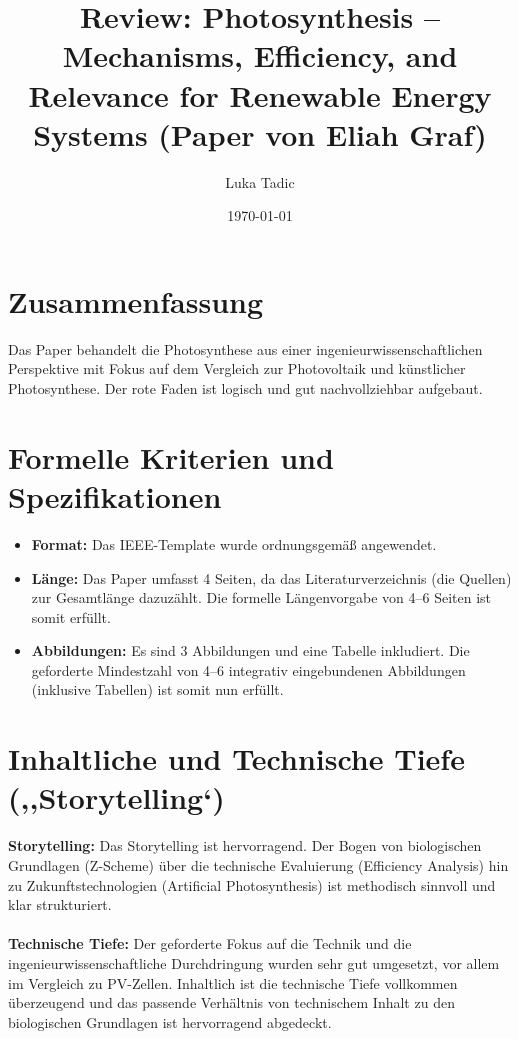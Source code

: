 ﻿\documentclass[11pt, a4paper, ngerman]{article}
\title{Review: Photosynthesis -- Mechanisms, Efficiency, and Relevance for Renewable Energy Systems (Paper von Eliah Graf)}
\author{Luka Tadic}
\date{\today}
\begin{document}
\maketitle

\section{Zusammenfassung}
Das Paper behandelt die Photosynthese aus einer ingenieurwissenschaftlichen Perspektive mit Fokus auf dem Vergleich zur Photovoltaik und künstlicher Photosynthese. Der rote Faden ist logisch und gut nachvollziehbar aufgebaut.

\section{Formelle Kriterien und Spezifikationen}
\begin{itemize}
    \item \textbf{Format:} Das IEEE-Template wurde ordnungsgemäß angewendet.
    \item \textbf{Länge:} Das Paper umfasst 4 Seiten, da das Literaturverzeichnis (die Quellen) zur Gesamtlänge dazuzählt. Die formelle Längenvorgabe von 4--6 Seiten ist somit erfüllt.
    \item \textbf{Abbildungen:} Es sind 3 Abbildungen und eine Tabelle inkludiert. Die geforderte Mindestzahl von 4--6 integrativ eingebundenen Abbildungen (inklusive Tabellen) ist somit nun erfüllt.
\end{itemize}

\section{Inhaltliche und Technische Tiefe (,,Storytelling`)}
\textbf{Storytelling:} Das Storytelling ist hervorragend. Der Bogen von biologischen Grundlagen (Z-Scheme) über die technische Evaluierung (Efficiency Analysis) hin zu Zukunftstechnologien (Artificial Photosynthesis) ist methodisch sinnvoll und klar strukturiert. \\\\
\textbf{Technische Tiefe:} Der geforderte Fokus auf die Technik und die ingenieurwissenschaftliche Durchdringung wurden sehr gut umgesetzt, vor allem im Vergleich zu PV-Zellen. Inhaltlich ist die technische Tiefe vollkommen überzeugend und das passende Verhältnis von technischem Inhalt zu den biologischen Grundlagen ist hervorragend abgedeckt.
\end{document}
